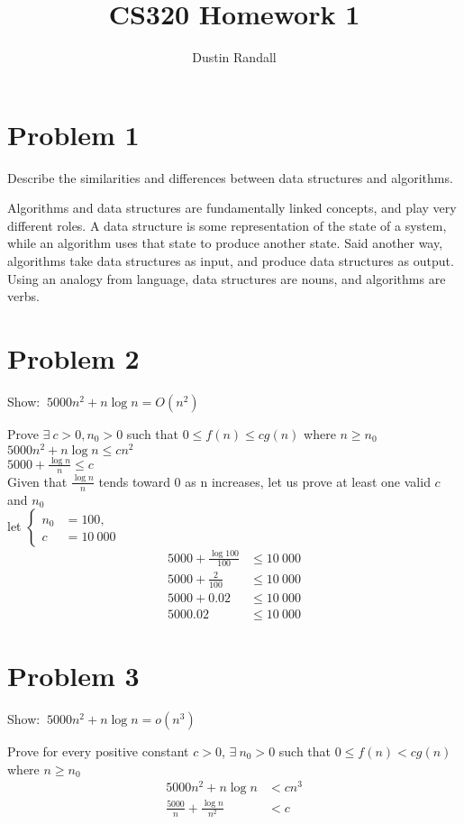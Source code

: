 \documentclass{article}
\begin{document}
\title{CS320 Homework 1}
\author{Dustin Randall}
\maketitle
\section{Problem 1}
\begin{em}
Describe the similarities and differences between data structures and algorithms.
\end{em}
Algorithms and data structures are fundamentally linked concepts, and play very different roles.
A data structure is some representation of the state of a system, while an algorithm uses that state to produce another state.
Said another way, algorithms take data structures as input, and produce data structures as output.
Using an analogy from language, data structures are nouns, and algorithms are verbs.

\section{Problem 2}
\begin{em}
Show: \(\medspace 5000n^2 + n \log n = O(n^2)\) \\
\end{em}
Prove \(\exists \medspace c > 0, n_0 > 0 \) such that \(0 \le f(n) \le c g(n) \) where \(n \ge n_0\) \\
\(5000n^2 + n \log n \le c n^2\) \\
\(5000 + \frac{\log n}{n} \le c\) \\
Given that \(\frac{\log n}{n}\) tends toward 0 as n increases, let us prove at least one valid \(c\) and \(n_0\) \\
let 
\(\begin{cases}
    n_0 & = 100, \\
    c & = 10~000
\end{cases}\)    
\begin{align}
    5000 + \frac{\log 100}{100} & \le 10~000 \\
    5000 + \frac{2}{100} & \le 10~000 \\
    5000 + 0.02 & \le 10~000 \\
    5000.02 & \le 10~000
\end{align}

\section{Problem 3}
\begin{em}
Show: \(\medspace 5000n^2 + n \log n = o(n^3)\) \\
\end{em}
Prove for every positive constant \(c > 0\), \(\exists \medspace n_0 > 0 \) such that \(0 \le f(n) < cg(n) \) where \(n \ge n_0\) \\
\begin{align}
    5000n^2 + n \log n & < c n^3 \\
    \frac{5000}{n} + \frac{\log n}{n^2} & < c
\end{align}
\end{document}
